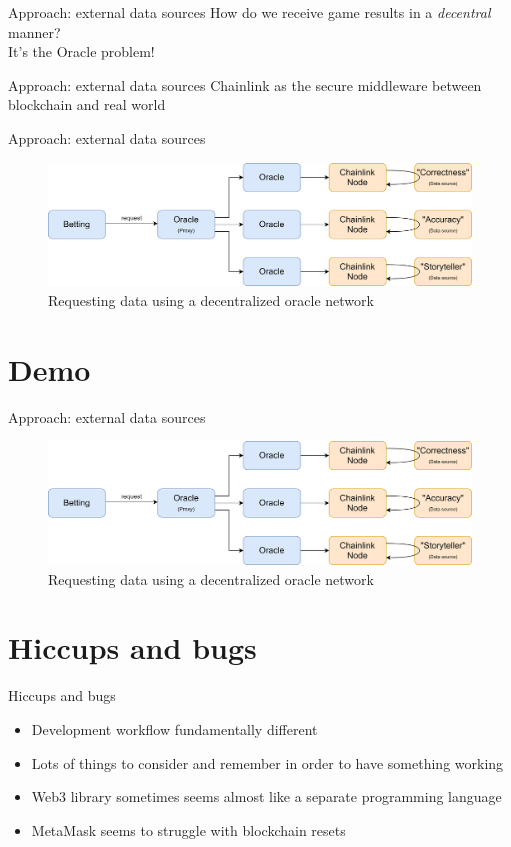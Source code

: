 \documentclass[aspectratio=169]{beamer}
\begin{document}
  \begin{frame}{Approach: external data sources}
    How do we receive game results in a \emph{decentral} manner?\pause\\
    It's the Oracle problem!
  \end{frame}

  \begin{frame}{Approach: external data sources}
    \centering\alert{Chainlink} as the secure middleware between blockchain and real world
  \end{frame}

  \begin{frame}{Approach: external data sources}
    \begin{figure}[htbp]
      \centering
      \includegraphics[scale=0.08]{img/oracle}
      \caption{Requesting data using a decentralized oracle network}
    \end{figure}
  \end{frame}

  \section{Demo}
  \begin{frame}{Approach: external data sources}
    \begin{figure}[htbp]
      \centering
      \includegraphics[scale=0.08]{img/oracle}
      \caption{Requesting data using a decentralized oracle network}
    \end{figure}
  \end{frame}

  \section{Hiccups and bugs}
  \begin{frame}{Hiccups and bugs}
    \begin{itemize}
      \item Development workflow fundamentally different
      \item Lots of things to consider and remember in order to have something working
      \item Web3 library sometimes seems almost like a separate programming language
      \item MetaMask seems to struggle with blockchain resets
    \end{itemize}
  \end{frame}
\end{document}
